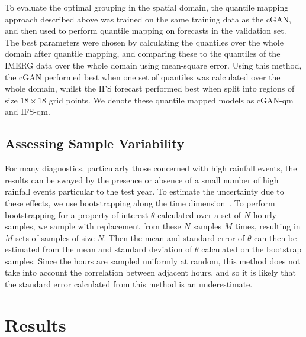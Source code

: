 \documentclass{article}
\begin{document}
To evaluate the optimal grouping in the spatial domain, the quantile mapping approach described above was trained on the same training data as the cGAN, and then used to perform quantile mapping on forecasts in the validation set. The best parameters were chosen by calculating the quantiles over the whole domain after quantile mapping, and comparing these to the quantiles of the IMERG data over the whole domain using mean-square error. Using this method, the cGAN performed best when one set of quantiles was calculated over the whole domain, whilst the IFS forecast performed best when split into regions of size $18 \times 18$ grid points. We denote these quantile mapped models as cGAN-qm and IFS-qm.



\subsection{Assessing Sample Variability}
\label{sec:sample_var}


For many diagnostics, particularly those concerned with high rainfall events, the results can be swayed by the presence or absence of a small number of high rainfall events particular to the test year. To estimate the uncertainty due to these effects, we use bootstrapping along the time dimension~\cite{efron_bootstrap_1986}. To perform bootstrapping for a property of interest $\theta$ calculated over a set of $N$ hourly samples, we sample with replacement from these $N$ samples $M$ times, resulting in $M$ sets of samples of size $N$. Then the mean and standard error of $\theta$ can then be estimated from the mean and standard deviation of $\theta$ calculated on the bootstrap samples. Since the hours are sampled uniformly at random, this method does not take into account the correlation between adjacent hours, and so it is likely that the standard error calculated from this method is an underestimate.




\section{Results}
\end{document}
